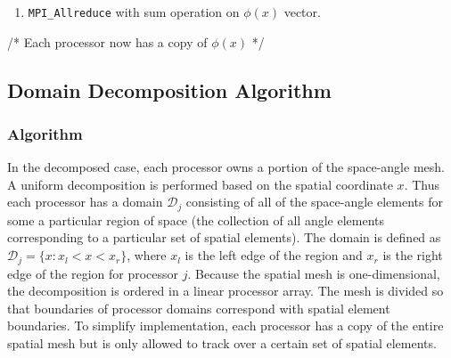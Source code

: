 \documentclass[12pt]{article}
\newcommand{\DD}{\mathcal{D}}
\begin{document}
{{\begin{algorithm}
\begin{enumerate}
\begin{enumerate}
    \item \textbf{For} {$N/p$ histories} \textbf{do}:
        \begin{enumerate}
       \item Source random $x$ and $\mu$ from the specified source distribution
    \item Sample how far the particle travels $x_0$ from the distribution $p(x_0) =
        \sigma e^{-\sigma x_0}$.
    \item Track particle to location of interaction:
        \begin{itemize}
            \item Tally the contribution to $\psi_i(x,\mu)$, the
                linear angular flux representation with each space-angle cell $i$
                that the history traverses
        \end{itemize}
    \item Terminate particle history
\end{enumerate}
    \item \textbf{For each cell:} average contribution of $N$ histories to all tallies
    \item Compute $\phi(x)$ by integrating $\psi(x,\mu)$ over $\mu$
\end{enumerate}
    \item \verb{MPI_Allreduce{ with sum operation on $\phi(x)$ vector.
\end{enumerate}
/* Each processor now has a copy of $\phi(x)$ */
\end{algorithm}

\clearpage

\subsection{Domain Decomposition Algorithm}

\subsubsection{Algorithm} 

In the decomposed case, each processor owns a portion of the space-angle mesh. A
uniform decomposition is performed based on the spatial coordinate $x$. Thus each
processor has a domain $\DD_j$ consisting of all of the space-angle elements for some
a particular region of space (the collection of all angle elements corresponding to a
particular set of spatial elements). The domain is defined as $\DD_j = \{x:x_l<x<x_r\}$, where
$x_l$ is the left edge of the region and $x_r$ is the right edge of the region for
processor $j$. Because the spatial mesh is one-dimensional, the
decomposition is ordered in a linear processor array.   The mesh is
divided so that boundaries of processor domains correspond with spatial element
boundaries.  To simplify implementation, each processor has a copy of the entire
spatial mesh but is only allowed to track over a certain set of spatial elements.

}}
\end{document}
